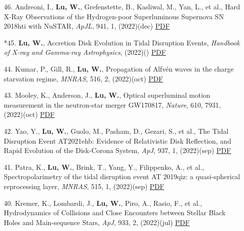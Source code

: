 \begin{itemize}[leftmargin=0.65cm]
\vspace{-0.1cm}
\item[46.]{Andreoni, I., {\bf Lu, W.}, Grefenstette, B., Kasliwal, M., Yan, L., et al., {Hard X-Ray Observations of the Hydrogen-poor Superluminous Supernova SN 2018hti with NuSTAR}, {\it ApJL}, 941, 1, (2022)(dec) \href{https://ui.adsabs.harvard.edu/abs/2022ApJ...941L..16A}{\underline{PDF}}}

\vspace{-0.1cm}
\item[*45.]{{\bf Lu, W.}, {Accretion Disk Evolution in Tidal Disruption Events}, {\it Handbook of X-ray and Gamma-ray Astrophysics}, (2022)() \href{https://ui.adsabs.harvard.edu/abs/2022hxga.book....3L}{\underline{PDF}}}

\vspace{-0.1cm}
\item[44.]{Kumar, P., Gill, R., {\bf Lu, W.}, {Propagation of Alfv{\'e}n waves in the charge starvation regime}, {\it MNRAS}, 516, 2, (2022)(oct) \href{https://ui.adsabs.harvard.edu/abs/2022MNRAS.516.2697K}{\underline{PDF}}}

\vspace{-0.1cm}
\item[43.]{Mooley, K., Anderson, J., {\bf Lu, W.}, {Optical superluminal motion measurement in the neutron-star merger GW170817}, {\it Nature}, 610, 7931, (2022)(oct) \href{https://ui.adsabs.harvard.edu/abs/2022Natur.610..273M}{\underline{PDF}}}

\vspace{-0.1cm}
\item[42.]{Yao, Y., {\bf Lu, W.}, Guolo, M., Pasham, D., Gezari, S., et al., {The Tidal Disruption Event AT2021ehb: Evidence of Relativistic Disk Reflection, and Rapid Evolution of the Disk-Corona System}, {\it ApJ}, 937, 1, (2022)(sep) \href{https://ui.adsabs.harvard.edu/abs/2022ApJ...937....8Y}{\underline{PDF}}}

\vspace{-0.1cm}
\item[41.]{Patra, K., {\bf Lu, W.}, Brink, T., Yang, Y., Filippenko, A., et al., {Spectropolarimetry of the tidal disruption event AT 2019qiz: a quasi-spherical reprocessing layer}, {\it MNRAS}, 515, 1, (2022)(sep) \href{https://ui.adsabs.harvard.edu/abs/2022MNRAS.515..138P}{\underline{PDF}}}

\vspace{-0.1cm}
\item[40.]{Kremer, K., Lombardi, J., {\bf Lu, W.}, Piro, A., Rasio, F., et al., {Hydrodynamics of Collisions and Close Encounters between Stellar Black Holes and Main-sequence Stars}, {\it ApJ}, 933, 2, (2022)(jul) \href{https://ui.adsabs.harvard.edu/abs/2022ApJ...933..203K}{\underline{PDF}}}


\end{itemize}
